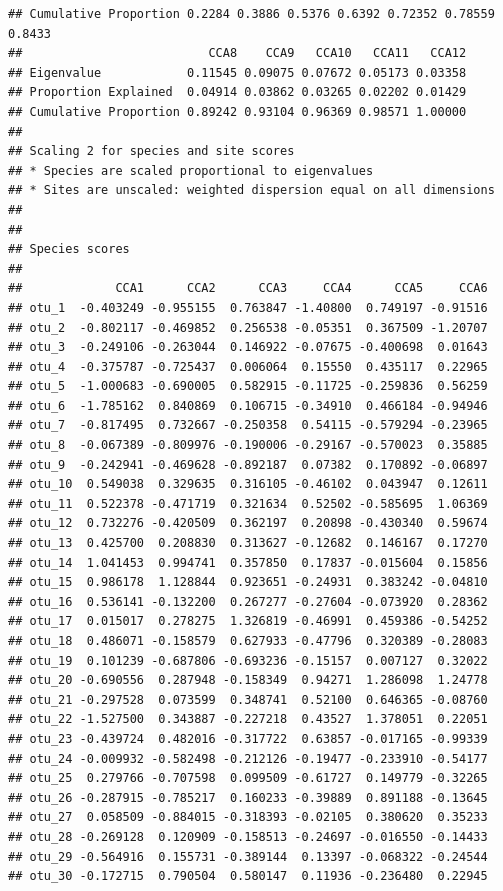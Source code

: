 \documentclass[
]{book}
\begin{document}
\begin{verbatim}
## Cumulative Proportion 0.2284 0.3886 0.5376 0.6392 0.72352 0.78559 0.8433
##                          CCA8    CCA9   CCA10   CCA11   CCA12
## Eigenvalue            0.11545 0.09075 0.07672 0.05173 0.03358
## Proportion Explained  0.04914 0.03862 0.03265 0.02202 0.01429
## Cumulative Proportion 0.89242 0.93104 0.96369 0.98571 1.00000
## 
## Scaling 2 for species and site scores
## * Species are scaled proportional to eigenvalues
## * Sites are unscaled: weighted dispersion equal on all dimensions
## 
## 
## Species scores
## 
##             CCA1      CCA2      CCA3     CCA4      CCA5     CCA6
## otu_1  -0.403249 -0.955155  0.763847 -1.40800  0.749197 -0.91516
## otu_2  -0.802117 -0.469852  0.256538 -0.05351  0.367509 -1.20707
## otu_3  -0.249106 -0.263044  0.146922 -0.07675 -0.400698  0.01643
## otu_4  -0.375787 -0.725437  0.006064  0.15550  0.435117  0.22965
## otu_5  -1.000683 -0.690005  0.582915 -0.11725 -0.259836  0.56259
## otu_6  -1.785162  0.840869  0.106715 -0.34910  0.466184 -0.94946
## otu_7  -0.817495  0.732667 -0.250358  0.54115 -0.579294 -0.23965
## otu_8  -0.067389 -0.809976 -0.190006 -0.29167 -0.570023  0.35885
## otu_9  -0.242941 -0.469628 -0.892187  0.07382  0.170892 -0.06897
## otu_10  0.549038  0.329635  0.316105 -0.46102  0.043947  0.12611
## otu_11  0.522378 -0.471719  0.321634  0.52502 -0.585695  1.06369
## otu_12  0.732276 -0.420509  0.362197  0.20898 -0.430340  0.59674
## otu_13  0.425700  0.208830  0.313627 -0.12682  0.146167  0.17270
## otu_14  1.041453  0.994741  0.357850  0.17837 -0.015604  0.15856
## otu_15  0.986178  1.128844  0.923651 -0.24931  0.383242 -0.04810
## otu_16  0.536141 -0.132200  0.267277 -0.27604 -0.073920  0.28362
## otu_17  0.015017  0.278275  1.326819 -0.46991  0.459386 -0.54252
## otu_18  0.486071 -0.158579  0.627933 -0.47796  0.320389 -0.28083
## otu_19  0.101239 -0.687806 -0.693236 -0.15157  0.007127  0.32022
## otu_20 -0.690556  0.287948 -0.158349  0.94271  1.286098  1.24778
## otu_21 -0.297528  0.073599  0.348741  0.52100  0.646365 -0.08760
## otu_22 -1.527500  0.343887 -0.227218  0.43527  1.378051  0.22051
## otu_23 -0.439724  0.482016 -0.317722  0.63857 -0.017165 -0.99339
## otu_24 -0.009932 -0.582498 -0.212126 -0.19477 -0.233910 -0.54177
## otu_25  0.279766 -0.707598  0.099509 -0.61727  0.149779 -0.32265
## otu_26 -0.287915 -0.785217  0.160233 -0.39889  0.891188 -0.13645
## otu_27  0.058509 -0.884015 -0.318393 -0.02105  0.380620  0.35233
## otu_28 -0.269128  0.120909 -0.158513 -0.24697 -0.016550 -0.14433
## otu_29 -0.564916  0.155731 -0.389144  0.13397 -0.068322 -0.24544
## otu_30 -0.172715  0.790504  0.580147  0.11936 -0.236480  0.22945

\end{verbatim}
\end{document}
